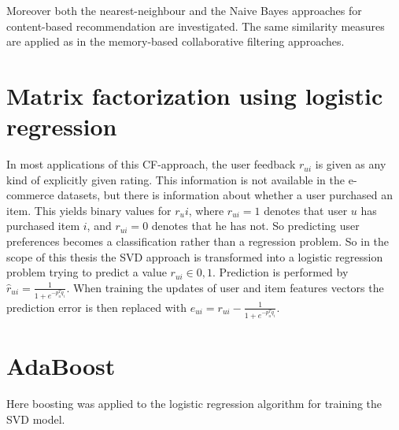 \documentclass[10pt]{reportMaster}
\begin{document}
Moreover both the nearest-neighbour and the Naive Bayes approaches for content-based recommendation are investigated.
The same similarity measures are applied as in the memory-based collaborative filtering approaches.






\section{Matrix factorization using logistic regression}
\label{sec:logRegSVD}
In most applications of this CF-approach, the user feedback $r_{ui}$ is given as any kind of explicitly given rating.
This information is not available in the e-commerce datasets, but there is information about whether a user purchased an item.
This yields binary values for $r_ui$, where $r_{ui} = 1$ denotes that user $u$ has purchased item $i$, and $r_{ui} = 0$ denotes that he has not.
So predicting user preferences becomes a classification rather than a regression problem.
So in the scope of this thesis the SVD approach is transformed into a logistic regression problem trying to predict a value $r_{ui} \in {0,1}$.
Prediction is performed by $\hat{r}_{ui} = \frac{1}{1 + e^{-p_u^Tq_i}}$.
When training the updates of user and item features vectors the prediction error is then replaced with $e_{ui} = r_{ui} - \frac{1}{1 + e^{-p_u^Tq_i}}$.

\section{AdaBoost}
\label{sec:myAdaBoost}
Here boosting was applied to the logistic regression algorithm for training the SVD model.






\end{document}
